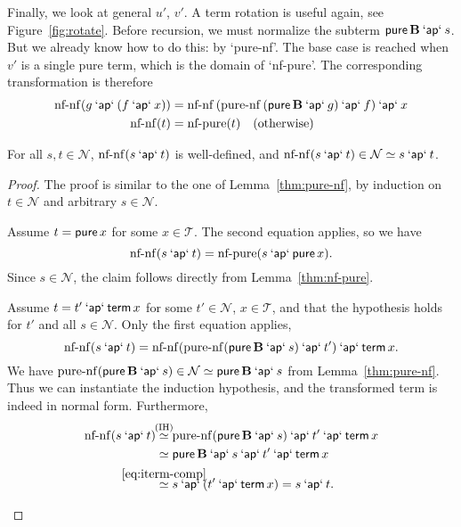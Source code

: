 Finally, we look at general $u'$, $v'$.
A term rotation is useful again, see Figure~\ref{fig:rotate}.
Before recursion, we must normalize the subterm $\operatorname{\mathsf{pure}} \mathbf{B} \mathbin{\mathsf{`ap`}} s$.
But we already know how to do this: by `pure-nf'.
The base case is reached when $v'$ is a single pure term, which is the domain
of `nf-pure'.
The corresponding transformation is therefore
\begin{align}
	\operatorname{nf-nf}(g \mathbin{\mathsf{`ap`}} (f \mathbin{\mathsf{`ap`}} x)) &=
		\operatorname{nf-nf}{(\operatorname{pure-nf}{(\operatorname{\mathsf{pure}} \mathbf{B} \mathbin{\mathsf{`ap`}} g)} \mathbin{\mathsf{`ap`}} f)} \mathbin{\mathsf{`ap`}} x \\
	\operatorname{nf-nf}(t) &= \operatorname{nf-pure}(t) \quad\text{(otherwise)}
\end{align}
\begin{lemma}\label{thm:nf-nf}
For all $s,t \in \mathcal{N}$, 
$\operatorname{nf-nf}(s \mathbin{\mathsf{`ap`}} t)$ is well-defined, and
$\operatorname{nf-nf}(s \mathbin{\mathsf{`ap`}} t) \in \mathcal{N} \simeq s \mathbin{\mathsf{`ap`}} t$.
\end{lemma}
\begin{proof}
The proof is similar to the one of Lemma~\ref{thm:pure-nf}, by induction on
$t \in \mathcal{N}$ and arbitrary $s \in \mathcal{N}$.
\begin{prfcases}
\item Assume $t = \operatorname{\mathsf{pure}} x$ for some $x \in \mathcal{T}$.
	The second equation applies, so we have
	\[ \operatorname{nf-nf}(s \mathbin{\mathsf{`ap`}} t) = \operatorname{nf-pure}(s \mathbin{\mathsf{`ap`}} \operatorname{\mathsf{pure}} x). \]
	Since $s \in \mathcal{N}$, the claim follows directly from Lemma~\ref{thm:nf-pure}.
\item Assume $t = t' \mathbin{\mathsf{`ap`}} \operatorname{\mathsf{term}} x$ for some
	$t' \in \mathcal{N}$, $x \in \mathcal{T}$, and that the hypothesis holds
	for $t'$ and all $s \in \mathcal{N}$.
	Only the first equation applies,
	\[ \operatorname{nf-nf}(s \mathbin{\mathsf{`ap`}} t) =
		\operatorname{nf-nf} (\operatorname{pure-nf}(\operatorname{\mathsf{pure}} \mathbf{B} \mathbin{\mathsf{`ap`}} s) \mathbin{\mathsf{`ap`}} t') \mathbin{\mathsf{`ap`}} \operatorname{\mathsf{term}} x. \]
	We have
	$\operatorname{pure-nf}(\operatorname{\mathsf{pure}} \mathbf{B} \mathbin{\mathsf{`ap`}} s) \in \mathcal{N} \simeq \operatorname{\mathsf{pure}} \mathbf{B} \mathbin{\mathsf{`ap`}} s$
	from Lemma~\ref{thm:pure-nf}.
	Thus we can instantiate the induction hypothesis, and the transformed term
	is indeed in normal form.
	Furthermore,
	\begin{align*}
		\operatorname{nf-nf}(s \sap t) &\stackrel{\mathclap{\text{(IH)}}}{\simeq}
			\operatorname{pure-nf}(\spure \mathbf{B} \sap s) \sap t' \sap \sterm x \\
		&\simeq \spure \mathbf{B} \sap s \sap t' \sap \sterm x \\
		&\stackrel{\mathclap{\eqref{eq:iterm-comp}}}{\simeq}
			s \sap (t' \sap \sterm x) = s \sap t. \qedhere
	\end{align*}
\end{prfcases}
\end{proof}


